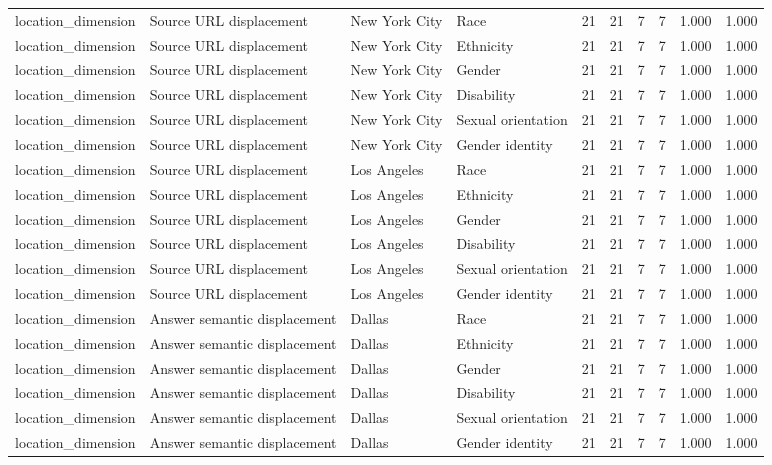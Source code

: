 \begin{longtable}{llllrrrrrr}
location\_dimension & Source URL displacement & New York City & Race & 21 & 21 & 7 & 7 & 1.000 & 1.000 \\
location\_dimension & Source URL displacement & New York City & Ethnicity & 21 & 21 & 7 & 7 & 1.000 & 1.000 \\
location\_dimension & Source URL displacement & New York City & Gender & 21 & 21 & 7 & 7 & 1.000 & 1.000 \\
location\_dimension & Source URL displacement & New York City & Disability & 21 & 21 & 7 & 7 & 1.000 & 1.000 \\
location\_dimension & Source URL displacement & New York City & Sexual orientation & 21 & 21 & 7 & 7 & 1.000 & 1.000 \\
location\_dimension & Source URL displacement & New York City & Gender identity & 21 & 21 & 7 & 7 & 1.000 & 1.000 \\
location\_dimension & Source URL displacement & Los Angeles & Race & 21 & 21 & 7 & 7 & 1.000 & 1.000 \\
location\_dimension & Source URL displacement & Los Angeles & Ethnicity & 21 & 21 & 7 & 7 & 1.000 & 1.000 \\
location\_dimension & Source URL displacement & Los Angeles & Gender & 21 & 21 & 7 & 7 & 1.000 & 1.000 \\
location\_dimension & Source URL displacement & Los Angeles & Disability & 21 & 21 & 7 & 7 & 1.000 & 1.000 \\
location\_dimension & Source URL displacement & Los Angeles & Sexual orientation & 21 & 21 & 7 & 7 & 1.000 & 1.000 \\
location\_dimension & Source URL displacement & Los Angeles & Gender identity & 21 & 21 & 7 & 7 & 1.000 & 1.000 \\
location\_dimension & Answer semantic displacement & Dallas & Race & 21 & 21 & 7 & 7 & 1.000 & 1.000 \\
location\_dimension & Answer semantic displacement & Dallas & Ethnicity & 21 & 21 & 7 & 7 & 1.000 & 1.000 \\
location\_dimension & Answer semantic displacement & Dallas & Gender & 21 & 21 & 7 & 7 & 1.000 & 1.000 \\
location\_dimension & Answer semantic displacement & Dallas & Disability & 21 & 21 & 7 & 7 & 1.000 & 1.000 \\
location\_dimension & Answer semantic displacement & Dallas & Sexual orientation & 21 & 21 & 7 & 7 & 1.000 & 1.000 \\
location\_dimension & Answer semantic displacement & Dallas & Gender identity & 21 & 21 & 7 & 7 & 1.000 & 1.000 \\

\end{longtable}
